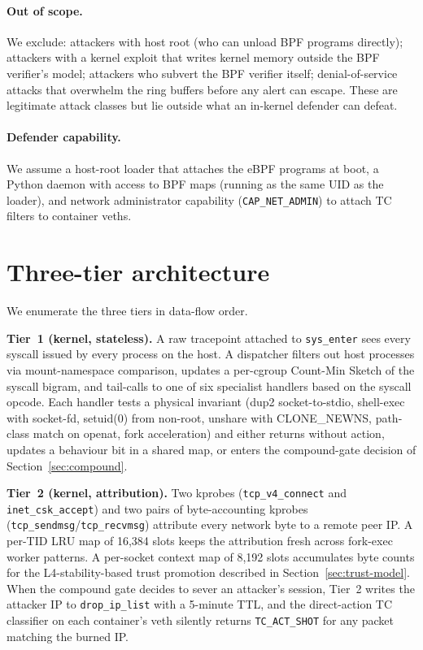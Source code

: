 \paragraph{Out of scope.} We exclude: attackers with host root (who can
unload BPF programs directly); attackers with a kernel exploit that writes
kernel memory outside the BPF verifier's model; attackers who subvert the
BPF verifier itself; denial-of-service attacks that overwhelm the ring
buffers before any alert can escape. These are legitimate attack classes
but lie outside what an in-kernel defender can defeat.

\paragraph{Defender capability.} We assume a host-root loader that attaches
the eBPF programs at boot, a Python daemon with access to BPF maps (running
as the same UID as the loader), and network administrator capability
(\texttt{CAP\_NET\_ADMIN}) to attach TC filters to container veths.

\section{Three-tier architecture}
\label{sec:tiers}

We enumerate the three tiers in data-flow order.

\textbf{Tier~1 (kernel, stateless).} A raw tracepoint attached to
\texttt{sys\_enter} sees every syscall issued by every process on the host.
A dispatcher filters out host processes via mount-namespace comparison,
updates a per-cgroup Count-Min Sketch of the syscall bigram, and tail-calls
to one of six specialist handlers based on the syscall opcode. Each
handler tests a physical invariant (dup2 socket-to-stdio, shell-exec with
socket-fd, setuid(0) from non-root, unshare with CLONE\_NEWNS, path-class
match on openat, fork acceleration) and either returns without action,
updates a behaviour bit in a shared map, or enters the compound-gate
decision of Section~\ref{sec:compound}.

\textbf{Tier~2 (kernel, attribution).} Two kprobes
(\texttt{tcp\_v4\_connect} and \texttt{inet\_csk\_accept}) and two pairs of
byte-accounting kprobes (\texttt{tcp\_sendmsg}/\texttt{tcp\_recvmsg})
attribute every network byte to a remote peer IP. A per-TID LRU map of
16,384 slots keeps the attribution fresh across fork-exec worker patterns.
A per-socket context map of 8,192 slots accumulates byte counts for the
L4-stability-based trust promotion described in Section~\ref{sec:trust-model}.
When the compound gate decides to sever an attacker's session, Tier~2
writes the attacker IP to \texttt{drop\_ip\_list} with a 5-minute TTL, and
the direct-action TC classifier on each container's veth silently returns
\texttt{TC\_ACT\_SHOT} for any packet matching the burned IP.

